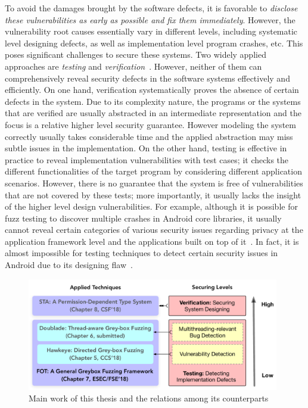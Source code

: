 To avoid the damages brought by the software defects, it is favorable to \emph{disclose these vulnerabilities as early as possible and fix them immediately}. However, the vulnerability root causes essentially vary in different levels, including systematic level designing defects, as well as implementation level program crashes, etc. This poses significant challenges to secure these systems. Two widely applied approaches are \emph{testing} and \emph{verification}~\cite{Hailpern:2002:SDT:1660992.1660994,Felderer:2016:MST:2904681.2904685,mc-at}. However, neither of them can comprehensively reveal security defects in the software systems effectively and efficiently. On one hand, verification systematically proves the absence of certain defects in the system. Due to its complexity nature, the programs or the systems that are verified are usually abstracted in an intermediate representation and the focus is a relative higher level security guarantee. However modeling the system correctly usually takes considerable time and the applied abstraction may miss subtle issues in the implementation. On the other hand, testing is effective in practice to reveal implementation vulnerabilities with test cases; it checks the different functionalities of the target program by considering different application scenarios. However, there is no guarantee that the system is free of vulnerabilities that are not covered by these tests; more importantly, it usually lacks the insight of the higher level design vulnerabilities. For example, although it is possible for fuzz testing to discover multiple crashes in Android core libraries, it usually cannot reveal certain categories of various security issues regarding privacy at the application framework level and the applications built on top of it~\cite{Enck:2009:UAS:1512148.1512324,Ernst:2014}. In fact, it is almost impossible for testing techniques to detect certain security issues in Android due to its designing flaw~\cite{url:android-flaw}.

\begin{figure}[t]
	\begin{center}
		\includegraphics[width=0.98\textwidth]{res/contributions}
		\caption{Main work of this thesis and the relations among its counterparts}
		\label{fig:works}
	\end{center}
\end{figure}



